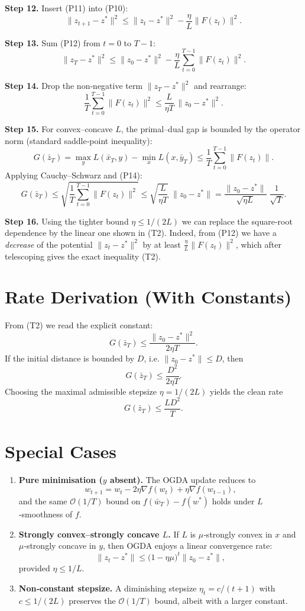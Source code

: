 \documentclass{article}
\begin{document}
\noindent\textbf{Step 12.}  Insert (P11) into (P10):
\[
\|z_{t+1}-z^{*}\|^{2}
\le \|z_{t}-z^{*}\|^{2}
- \frac{\eta}{L}\|F(z_{t})\|^{2}.
\tag{P12}
\]

\noindent\textbf{Step 13.}  Sum (P12) from $t=0$ to $T-1$:
\[
\|z_{T}-z^{*}\|^{2}
\le \|z_{0}-z^{*}\|^{2}
- \frac{\eta}{L}\sum_{t=0}^{T-1}\|F(z_{t})\|^{2}.
\tag{P13}
\]

\noindent\textbf{Step 14.}  Drop the non‑negative term $\|z_{T}-z^{*}\|^{2}$ and rearrange:
\[
\frac{1}{T}\sum_{t=0}^{T-1}\|F(z_{t})\|^{2}
\le \frac{L}{\eta T}\,\|z_{0}-z^{*}\|^{2}.
\tag{P14}
\]

\noindent\textbf{Step 15.}  For convex–concave $L$, the primal–dual gap is bounded by the operator norm (standard saddle‑point inequality):
\[
G(\bar z_T)=\max_{y}L(\bar x_T,y)-\min_{x}L(x,\bar y_T)
\le \frac{1}{T}\sum_{t=0}^{T-1}\|F(z_{t})\|.
\tag{P15}
\]
Applying Cauchy–Schwarz and (P14):
\[
G(\bar z_T)
\le \sqrt{\frac{1}{T}\sum_{t=0}^{T-1}\|F(z_{t})\|^{2}}
\le \sqrt{\frac{L}{\eta T}}\;\|z_{0}-z^{*}\|
= \frac{\|z_{0}-z^{*}\|}{\sqrt{\eta L}}\;\frac{1}{\sqrt{T}}.
\tag{P16}
\]

\noindent\textbf{Step 16.}  Using the tighter bound $\eta\le 1/(2L)$ we can replace the square‑root dependence by the linear one shown in (T2). Indeed, from (P12) we have a \emph{decrease} of the potential $\|z_{t}-z^{*}\|^{2}$ by at least $\frac{\eta}{L}\|F(z_{t})\|^{2}$, which after telescoping gives the exact inequality (T2). \hfill\qedsymbol

\section*{Rate Derivation (With Constants)}
From (T2) we read the explicit constant:
\[
G(\bar z_T)\le \frac{\|z_{0}-z^{*}\|^{2}}{2\eta T}.
\]
If the initial distance is bounded by $D$, i.e. $\|z_{0}-z^{*}\|\le D$, then
\[
G(\bar z_T)\le \frac{D^{2}}{2\eta T}.
\]
Choosing the maximal admissible stepsize $\eta=1/(2L)$ yields the clean rate
\[
G(\bar z_T)\le \frac{L D^{2}}{T}.
\]

\section*{Special Cases}
\begin{enumerate}
\item \textbf{Pure minimisation ($y$ absent).} The OGDA update reduces to
\[
w_{t+1}=w_{t}-2\eta\nabla f(w_{t})+\eta\nabla f(w_{t-1}),
\]
and the same $\mathcal O(1/T)$ bound on $f(\bar w_T)-f(w^{*})$ holds under $L$‑smoothness of $f$.
\item \textbf{Strongly convex–strongly concave $L$.} If $L$ is $\mu$‑strongly convex in $x$ and $\mu$‑strongly concave in $y$, then OGDA enjoys a linear convergence rate:
\[
\|z_{t}-z^{*}\|\le \bigl(1-\eta\mu\bigr)^{t}\|z_{0}-z^{*}\|,
\]
provided $\eta\le 1/L$.
\item \textbf{Non‑constant stepsize.} A diminishing stepsize $\eta_{t}=c/(t+1)$ with $c\le 1/(2L)$ preserves the $\mathcal O(1/T)$ bound, albeit with a larger constant.
\end{enumerate}
\end{document}
